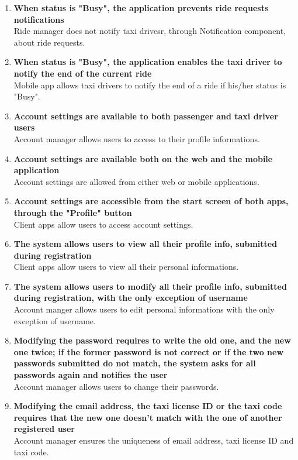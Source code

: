 \begin{enumerate}
	\item \textbf{When status is "Busy", the application prevents ride requests notifications}\\
	Ride manager does not notify taxi drivesr, through Notification component, about ride requests.
	
	\item \textbf{When status is "Busy", the application enables the taxi driver to notify the end of the current ride}\\
	Mobile app allows taxi drivers to notify the end of a ride if his/her status is "Busy".
	
	\item \textbf{Account settings are available to both passenger and taxi driver users}\\
	Account manager allows users to access to their profile informations.
	
	\item \textbf{Account settings are available both on the web and the mobile application}\\
	Account settings are allowed from either web or mobile applications.
	
	\item \textbf{Account settings are accessible from the start screen of both apps, through the "Profile" button}\\
	Client apps allow users to access account settings.
	
	\item \textbf{The system allows users to view all their profile info, submitted during registration}\\
	Client apps allow users to view all their personal informations.
	
	\item \textbf{The system allows users to modify all their profile info, submitted during registration, with the only exception of username}\\
	Account manger allows users to edit personal informations with the only exception of username.
	
	\item \textbf{Modifying the password requires to write the old one, and the new one twice; if the former password is not correct or if the two new passwords submitted do not match, the system asks for all passwords again and notifies the user}\\
	Account manager allows users to change their passwords.
	
	\item \textbf{Modifying the email address, the taxi license ID or the taxi code requires that the new one doesn't match with the one of another registered user}\\
	Account manager ensures the uniqueness of email address, taxi license ID and taxi code.
	

\end{enumerate}
